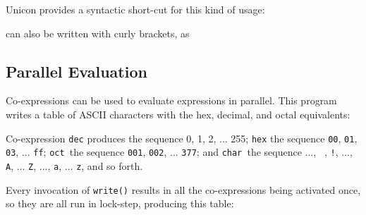 \noindent
Unicon provides a syntactic short-cut for this kind of usage:


\noindent
can also be written with curly brackets, as


\subsection[Parallel Evaluation]{Parallel Evaluation}

Co-expressions can be used to evaluate
expressions {\textquotedbl}in parallel{\textquotedbl}.
This program writes a table of ASCII characters with the
hex, decimal, and octal equivalents:


Co-expression \texttt{dec} produces the sequence 0, 1, 2, ... 255;
\texttt{hex} the sequence \texttt{{\textquotedbl}00{\textquotedbl}},
\texttt{{\textquotedbl}01{\textquotedbl}},
\texttt{{\textquotedbl}03{\textquotedbl}}, ...
\texttt{{\textquotedbl}ff{\textquotedbl}}; \texttt{oct}\texttt{ }the
sequence \texttt{{\textquotedbl}001{\textquotedbl}},
\texttt{{\textquotedbl}002{\textquotedbl}}, ...
\texttt{{\textquotedbl}377{\textquotedbl}}; and \texttt{char}\texttt{
}the sequence ..., \texttt{{\textquotedbl} {\textquotedbl}},
\texttt{{\textquotedbl}!{\textquotedbl}}, ...,
\texttt{{\textquotedbl}A{\textquotedbl}}, ...
\texttt{{\textquotedbl}Z{\textquotedbl}}, ...,
\texttt{{\textquotedbl}a{\textquotedbl}}, ...
\texttt{{\textquotedbl}z{\textquotedbl}}, and so forth.

Every invocation of \texttt{write()} results in all the co-expressions
being activated once, so they are all run in lock-step, producing this
table:

